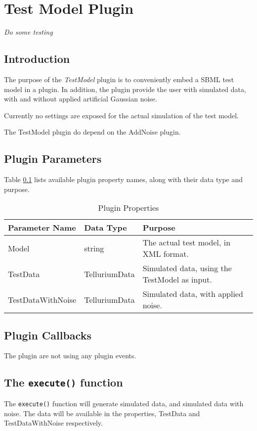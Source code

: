 \chapter*{Test Model Plugin}
\setcounter{chapter}{1}
\emph{Do some testing}
\section{Introduction}
The purpose of the \emph{TestModel} plugin is to conveniently embed a SBML test model in a plugin. In addition, the plugin provide the user with simulated data, with and without applied artificial Gaussian noise. 

Currently no settings are exposed for the actual simulation of the test model.

The TestModel plugin do depend on the AddNoise plugin.
 
\section{Plugin Parameters}
Table \ref{table:PluginProperties} lists available plugin property names, along with their data type and purpose.


\begin{table}[ht]
\centering %
\begin{tabular}{l l p{7.5cm}} %

Parameter Name & Data Type & Purpose \\ [0.5ex] %
\hline %
Model         			& 	string 				& The actual test model, in XML format. \\
TestData      			& 	TelluriumData    	& Simulated data, using the TestModel as input. \\
TestDataWithNoise    	& 	TelluriumData  	    & Simulated data, with applied noise. \\

\hline %
\end{tabular}
\caption{Plugin Properties} 
\label{table:PluginProperties} 
\end{table}

\section{Plugin Callbacks}
The plugin are not using any plugin events.


\section{The \texttt{execute()} function}
The \verb|execute()| function will generate simulated data, and simulated data with noise. The data will be available in the properties, TestData and TestDataWithNoise respectively. 

